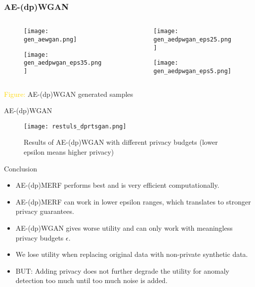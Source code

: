 \begin{frame}
    \frametitle{AE-(dp)WGAN}

    \begin{columns}
        \begin{column}{0.48\textwidth}
        \begin{figure}
            \centering
            \texttt{[image: gen\_aewgan.png]}
        \end{figure}
        \begin{figure}[h]
            \centering
            \texttt{[image: gen\_aedpwgan\_eps35.png]}
        \end{figure}
    \end{column}
    \begin{column}{0.48\textwidth}
        \begin{figure}
            \centering
            \texttt{[image: gen\_aedpwgan\_eps25.png]}
        \end{figure}
        \begin{figure}[h]
            \centering
            \texttt{[image: gen\_aedpwgan\_eps5.png]}
        \end{figure}
    \end{column}
    
    \end{columns}
    \centering
    \textcolor{gold}{Figure:} AE-(dp)WGAN generated samples

\end{frame}

\begin{frame}{AE-(dp)WGAN}
    \begin{figure}
        \centering
        \texttt{[image: restuls\_dprtsgan.png]}
        \caption{Results of AE-(dp)WGAN with different privacy budgets (lower epsilon means higher privacy)}
        \label{fig:enter-label}
    \end{figure}
\end{frame}

\begin{frame}{Conclusion}
    \begin{itemize}
        \item<1-> \alert{AE-(dp)MERF performs best} and is very efficient computationally.
        \item<2-> AE-(dp)MERF can work in \alert{lower epsilon ranges}, which translates to \alert{stronger privacy guarantees}.
        \item<3-> \alert{AE-(dp)WGAN gives worse utility} and can only work with meaningless privacy budgets $\epsilon$.
        \item<4-> We lose utility when \alert{replacing original data with non-private synthetic} data.
        \item<5-> BUT: Adding \alert{privacy does not further degrade the utility} for anomaly detection too much until too much noise is added.
    \end{itemize}
\end{frame}

